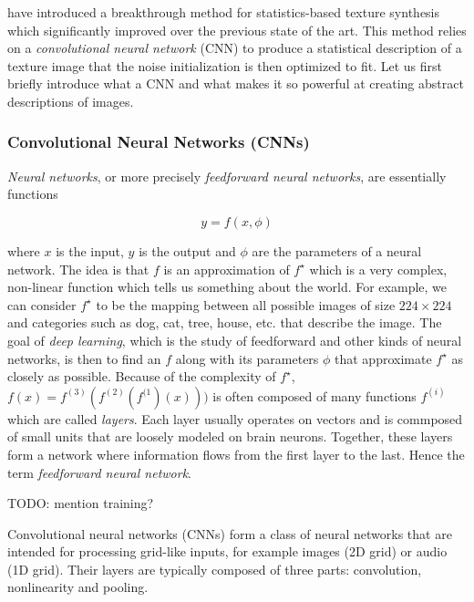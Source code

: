 \citet{Gatys2015} have introduced a breakthrough method for statistics-based texture synthesis which significantly improved over the previous state of the art. This method relies on a \textit{convolutional neural network} (CNN) to produce a statistical description of a texture image that the noise initialization is then optimized to fit. Let us first briefly introduce what a CNN and what makes it so powerful at creating abstract descriptions of images.

\subsubsection{Convolutional Neural Networks (CNNs)}
\label{section:background-texture_synthesis-statistics_based-cnns}

\textit{Neural networks}, or more precisely \textit{feedforward neural networks}, are essentially functions

\begin{equation}
    \label{eq:neural_network}
    y = f(x, \phi)
\end{equation}

where \(x\) is the input, \(y\) is the output and \(\phi\) are the parameters of a neural network. The idea is that \(f\) is an approximation of \(f^\star\) which is a very complex, non-linear function which tells us something about the world. For example, we can consider \(f^\star\) to be the mapping between all possible images of size \(224 \times 224\) and categories such as dog, cat, tree, house, etc. that describe the image. The goal of \textit{deep learning}, which is the study of feedforward and other kinds of neural networks, is then to find an \(f\) along with its parameters \(\phi\) that approximate \(f^\star\) as closely as possible. Because of the complexity of \(f^\star\), \(f(x) = f^{(3)}(f^{(2)}(f^{(1})(x)))\) is often composed of many functions \(f^{(i)}\) which are called \textit{layers}. Each layer usually operates on vectors and is commposed of small units that are loosely modeled on brain neurons. Together, these layers form a network where information flows from the first layer to the last. Hence the term \textit{feedforward neural network}.

{\color{red} TODO: mention training?}

Convolutional neural networks (CNNs) form a class of neural networks that are intended for processing grid-like inputs, for example images (2D grid) or audio (1D grid). Their layers are typically composed of three parts: convolution, nonlinearity and pooling.

